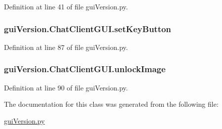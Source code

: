 Definition at line 41 of file gui\+Version.\+py.

\hypertarget{classgui_version_1_1_chat_client_g_u_i_a6f8fa5385bc6fa43fe07f02151b54dac}{}
\subsubsection[{set\+Key\+Button}]{\setlength{\rightskip}{0pt plus 5cm}gui\+Version.\+Chat\+Client\+G\+U\+I.\+set\+Key\+Button}\label{classgui_version_1_1_chat_client_g_u_i_a6f8fa5385bc6fa43fe07f02151b54dac}


Definition at line 87 of file gui\+Version.\+py.

\hypertarget{classgui_version_1_1_chat_client_g_u_i_ac9bcddaa82b6d786fa50638f18fd814b}{}
\subsubsection[{unlock\+Image}]{\setlength{\rightskip}{0pt plus 5cm}gui\+Version.\+Chat\+Client\+G\+U\+I.\+unlock\+Image}\label{classgui_version_1_1_chat_client_g_u_i_ac9bcddaa82b6d786fa50638f18fd814b}


Definition at line 90 of file gui\+Version.\+py.



The documentation for this class was generated from the following file\+:\begin{DoxyCompactItemize}
\item 
\hyperlink{gui_version_8py}{gui\+Version.\+py}\end{DoxyCompactItemize}
